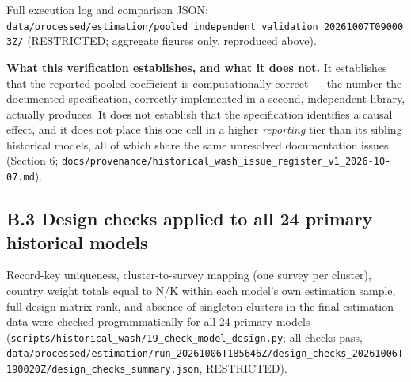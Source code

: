 Full execution log and comparison JSON: \texttt{data/processed/estimation/pooled\_independent\_validation\_20261007T090003Z/} (RESTRICTED; aggregate figures only, reproduced above).

\textbf{What this verification establishes, and what it does not.} It establishes that the reported pooled coefficient is computationally correct --- the number the documented specification, correctly implemented in a second, independent library, actually produces. It does not establish that the specification identifies a causal effect, and it does not place this one cell in a higher \textit{reporting} tier than its sibling historical models, all of which share the same unresolved documentation issues (Section 6; \texttt{docs/provenance/historical\_wash\_issue\_register\_v1\_2026-10-07.md}).

\subsection*{B.3 Design checks applied to all 24 primary historical models}

Record-key uniqueness, cluster-to-survey mapping (one survey per cluster), country weight totals equal to N/K within each model's own estimation sample, full design-matrix rank, and absence of singleton clusters in the final estimation data were checked programmatically for all 24 primary models (\texttt{scripts/historical\_wash/19\_check\_model\_design.py}; all checks pass, \texttt{data/processed/estimation/run\_20261006T185646Z/design\_checks\_20261006T190020Z/design\_checks\_summary.json}, RESTRICTED).
